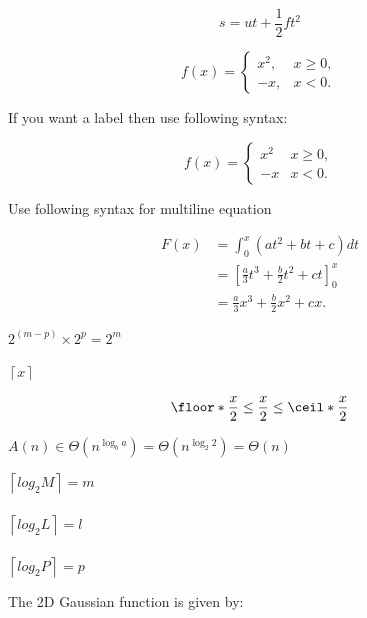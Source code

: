 
\begin{equation}
s=ut+\frac{1}{2}ft^2
\end{equation}


\[
  f(x) =
  \begin{cases}
    x^2, & x \ge 0, \\
    -x,  & x < 0.
  \end{cases}
\]


If you want a label then use following syntax:

\begin{equation}
  f(x)=
  \begin{cases}
    x^2 & x\ge0,\\
    -x  & x<0.
  \end{cases}
\end{equation}


Use following syntax for multiline equation

\begin{align}
  F(x) &= \int_0^x \left( a t^2 + b t + c \right) dt \nonumber\\
       &= \left[\tfrac{a}{3}t^3 + \tfrac{b}{2}t^2 + ct\right]_{0}^{x} \\
       &= \tfrac{a}{3}x^3 + \tfrac{b}{2}x^2 + c x. \nonumber
\end{align}




$2^{(m-p)} \times 2^p=2^m$


$\left \lceil{x}\right \rceil $




  \begin{equation*}
    \floor*{\frac{x}{2}} \leq \frac{x}{2} \leq \ceil*{\frac{x}{2}}
  \end{equation*}




    $A(n) \in \Theta(n^{\log_b a}) = \Theta(n^{\log_2 2} ) = \Theta(n)$


$\left \lceil{log_2 M}\right \rceil =m$
\\\\
$\left \lceil{log_2 L}\right \rceil =l$
\\\\
$\left \lceil{log_2 P}\right \rceil =p$



    The 2D Gaussian function is given by:

